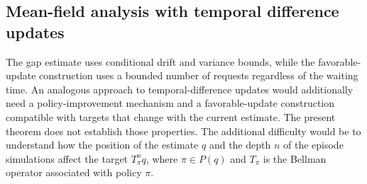 




















































































\subsection{Mean-field analysis with temporal difference updates}
\label{sec: discussion temporal difference}

The gap estimate uses conditional drift and variance bounds, while the favorable-update construction uses a bounded number of requests regardless of the waiting time. An analogous approach to temporal-difference updates would additionally need a policy-improvement mechanism and a favorable-update construction compatible with targets that change with the current estimate. The present theorem does not establish those properties.
The additional difficulty would be to understand how the position of the estimate $q$ and the depth $n$ of the episode simulations affect the target $T_{\pi}^n q$, where $\pi \in P(q)$ and $T_\pi$ is the Bellman operator associated with policy $\pi$.




